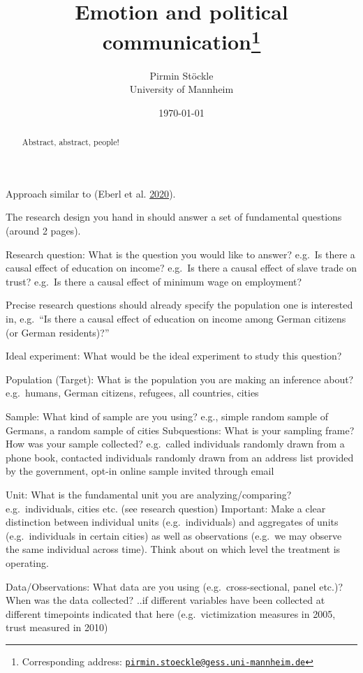 \documentclass[
  12pt,
]{article}
\title{\vspace{1cm}Emotion and political communication\footnote{Corresponding address: \href{mailto:pirmin.stoeckle@gess.uni-mannheim.de}{\nolinkurl{pirmin.stoeckle@gess.uni-mannheim.de}}}\vspace{0.5cm}\\}
\author{Pirmin Stöckle\\
University of Mannheim}
\date{\today}
\begin{document}
\maketitle
\begin{abstract}
\noindent{} Abstract, abstract, people!\vspace{.8cm}
\end{abstract}

Approach similar to (Eberl et al. \protect\hyperlink{ref-eberl2020what}{2020}).

The research design you hand in should answer a set of fundamental questions (around 2 pages).

Research question: What is the question you would like to answer?
e.g.~Is there a causal effect of education on income?
e.g.~Is there a causal effect of slave trade on trust?
e.g.~Is there a causal effect of minimum wage on employment?

Precise research questions should already specify the population one is interested in, e.g.~``Is there a causal effect of education on income among German citizens (or German residents)?''

Ideal experiment: What would be the ideal experiment to study this question?

Population (Target): What is the population you are making an inference about?
e.g.~humans, German citizens, refugees, all countries, cities

Sample: What kind of sample are you using?
e.g., simple random sample of Germans, a random sample of cities
Subquestions: What is your sampling frame? How was your sample collected?
e.g.~called individuals randomly drawn from a phone book, contacted individuals randomly drawn from an address list provided by the government, opt-in online sample invited through email

Unit: What is the fundamental unit you are analyzing/comparing?
e.g.~individuals, cities etc. (see research question)
Important: Make a clear distinction between individual units (e.g.~individuals) and aggregates of units (e.g.~individuals in certain cities) as well as observations (e.g.~we may observe the same individual across time). Think about on which level the treatment is operating.

Data/Observations: What data are you using (e.g.~cross-sectional, panel etc.)? When was the data collected?
..if different variables have been collected at different timepoints indicated that here (e.g.~victimization measures in 2005, trust measured in 2010)
\end{document}
